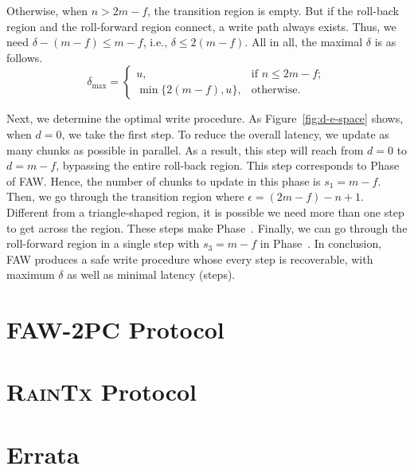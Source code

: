 \documentclass[letterpaper,10pt,twocolumn]{article}
\def\protocol/{FAW}
\begin{document}
Otherwise, when $n > 2m - f$, the transition region is empty. But if the
roll-back region and the roll-forward region connect, a write path 
always exists. Thus, we need
$\delta - (m - f) \le m - f$, i.e., $\delta \le 2(m
- f)$. All in all, the maximal $\delta$ is as follows.
\begin{equation}
\delta_{\max} =
\begin{cases}
u, & \text{if } n \le 2m-f;\\
\min\{2(m-f), u\}, & \text{otherwise.}
\end{cases}
\label{eq:delta}
\end{equation}

Next, we determine the optimal write procedure.
As Figure~\ref{fig:d-e-space} shows, when $d = 0$, we take the first step. To reduce the overall latency, we update as many chunks as possible in parallel.
As a result, this step will reach from $d=0$ to $d=m-f$, bypassing the entire roll-back region.
This step corresponds to Phase~ of \protocol/.
Hence, the number of chunks to update in this phase is $s_1=m-f$.
Then, we go through the transition region where $\epsilon = (2m - f) - n + 1$.
Different from a triangle-shaped region, it is possible we need more than one
step to get across the region.
These steps make Phase~.
Finally, we can go through the roll-forward region in a single step with $s_3=m-f$ in Phase~.
In conclusion, \protocol/ produces a safe write procedure whose every step is recoverable, with maximum $\delta$ as well as minimal latency (steps).

\section{\protocol/-2PC Protocol}
\label{sec:2pc}


\section{\textsc{RainTx} Protocol}
\label{sec:raintx}

\section{Errata}
\label{sec:errata}
\end{document}
